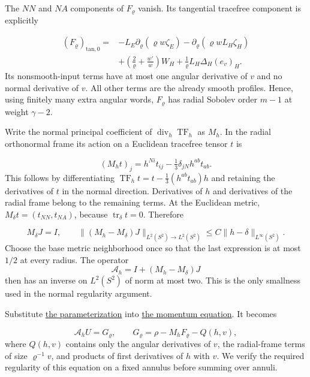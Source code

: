 \documentclass[
  english,
  11pt,
  reqno]{amsart}
\begin{document}
The \(NN\) and \(NA\) components of \(F_\varrho\) vanish. Its tangential
tracefree component is explicitly

\label{eq:online-momentum-explicit-remainder} \[
\begin{aligned}
(F_\varrho)_{\mathrm{tan},0}
={}&-L_E\partial_\varrho(\varrho w\zeta_E)
 -\partial_\varrho(\varrho wL_H\zeta_H)\\
&+\left(\frac2\varrho+\frac{w'}w\right)W_H
 +\frac1\varrho L_H\Delta_H(e_v)_H.
\end{aligned}
\] Its nonsmooth-input terms have at most one angular derivative of
\(v\) and no normal derivative of \(v\). All other terms are the already
smooth profiles. Hence, using finitely many extra angular words,
\(F_\varrho\) has radial Sobolev order \(m-1\) at weight \(\gamma-2\).

Write the normal principal coefficient of
\(\operatorname{div}_h\operatorname{TF}_h\) as \(M_h\). In the radial
orthonormal frame its action on a Euclidean tracefree tensor \(t\) is

\label{eq:online-momentum-principal-matrix} \[
(M_h t)_j=h^{Ni}t_{ij}
                   -\tfrac13\delta_{jN}h^{ab}t_{ab}.
\] This follows by differentiating
\(\operatorname{TF}_h t=t-\tfrac13(h^{ab}t_{ab})h\) and retaining the
derivatives of \(t\) in the normal direction. Derivatives of \(h\) and
derivatives of the radial frame belong to the remaining terms. At the
Euclidean metric, \(M_\delta t=(t_{NN},t_{NA})\), because
\(\operatorname{tr}_\delta t=0\). Therefore

\label{eq:online-momentum-fixed-normal-margin} \[
M_\delta J=I,\qquad
\|(M_h-M_\delta)J\|_{L^2(S^2)\to L^2(S^2)}
 \le C\|h-\delta\|_{L^\infty(S^2)}.
\] Choose the base metric neighborhood once so that the last expression
is at most \(1/2\) at every radius. The operator \[
\mathcal A_h=I+(M_h-M_\delta)J
\] then has an inverse on \(L^2(S^2)\) of norm at most two. This is the
only smallness used in the normal regularity argument.

Substitute \hyperref[eq:online-extension-momentum-normal-system]{the
parameterization} into
\hyperref[eq:online-momentum-variable-metric-equation]{the momentum
equation}. It becomes

\label{eq:online-momentum-invertible-normal-equation} \[
\mathcal A_hU=G_\varrho,
\qquad
G_\varrho=\rho-M_hF_\varrho-Q(h,v),
\] where \(Q(h,v)\) contains only the angular derivatives of \(v\), the
radial-frame terms of size \(\varrho^{-1}v\), and products of first
derivatives of \(h\) with \(v\). We verify the required regularity of
this equation on a fixed annulus before summing over annuli.
\end{document}
